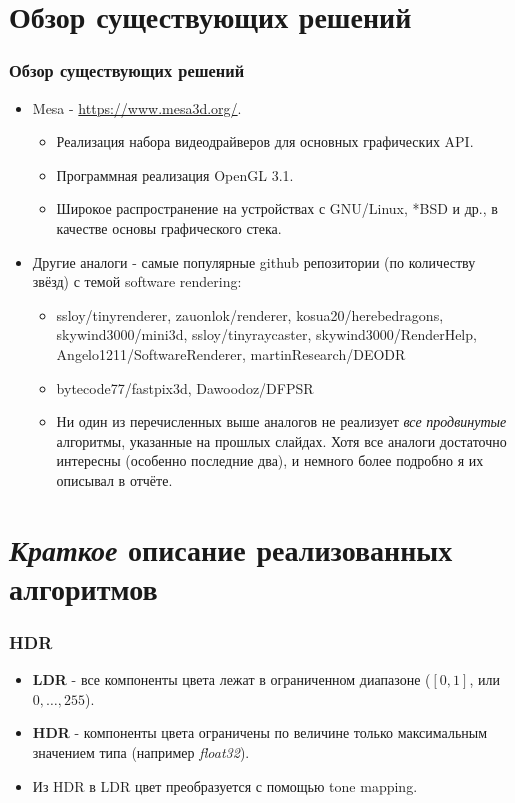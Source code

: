 \documentclass{beamer}
\begin{document}
	
	\section{Обзор существующих решений}
	\begin{frame}
		\frametitle{Обзор существующих решений}
		
		\begin{itemize}
			\item<1-> Mesa - {\scriptsize \url{https://www.mesa3d.org/}}.
			\begin{itemize}
				\item<1-> Реализация набора видеодрайверов для основных графических API.
				\item<1-> Программная реализация OpenGL 3.1.
				\item<1-> Широкое распространение на устройствах с GNU/Linux, *BSD и др., в качестве основы графического стека. 
			\end{itemize}
			\item<2-> Другие аналоги - самые популярные github репозитории (по количеству звёзд) с темой software rendering:
			\begin{itemize}
				\item<2-> ssloy/tinyrenderer, zauonlok/renderer, kosua20/herebedragons, skywind3000/mini3d, ssloy/tinyraycaster, skywind3000/RenderHelp, Angelo1211/SoftwareRenderer, martinResearch/DEODR
				\item<2-> bytecode77/fastpix3d, Dawoodoz/DFPSR
				\item<2-> Ни один из перечисленных выше аналогов не реализует \textit{все} \textit{продвинутые} алгоритмы, указанные на прошлых слайдах. Хотя все аналоги достаточно интересны (особенно последние два), и немного более подробно я их описывал в отчёте.
			\end{itemize}
		\end{itemize}
	\end{frame}

\section{\textit{Краткое} описание реализованных алгоритмов}

\begin{frame}
	\frametitle{HDR}
	
	\begin{itemize}
		\item<1-> \textbf{LDR} - все компоненты цвета лежат в ограниченном диапазоне ($[0, 1]$, или $0, \ldots, 255$).
		
		\item<1-> \textbf{HDR} - компоненты цвета ограничены по величине только максимальным значением типа (например \textit{float32}).
		
		\item<1-> Из HDR в LDR цвет преобразуется с помощью tone mapping.
		
	\end{itemize}
\end{frame}
\end{document}
